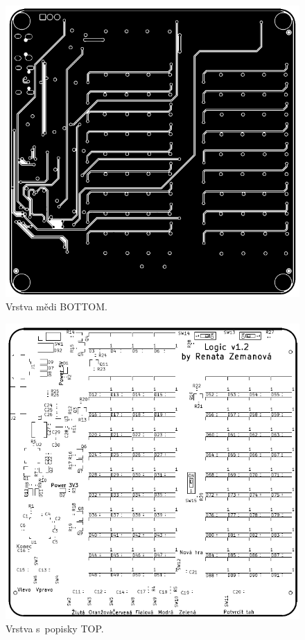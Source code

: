   \begin{figure}[!h]
    \begin{center}
      \includegraphics[scale=0.9]{prilohy/Verze2_vrstva_Cu_BOTTOM.png}
    \end{center}
    \caption[Vrstva mědi BOTTOM]{Vrstva mědi BOTTOM.}
  \end{figure}

  \begin{figure}[!h]
    \begin{center}
      \includegraphics[scale=0.9]{prilohy/Verze2_vrstva_popisky_TOP.png}
    \end{center}
    \caption[Vrstva s~popisky TOP]{Vrstva s~popisky TOP.}
  \end{figure}

